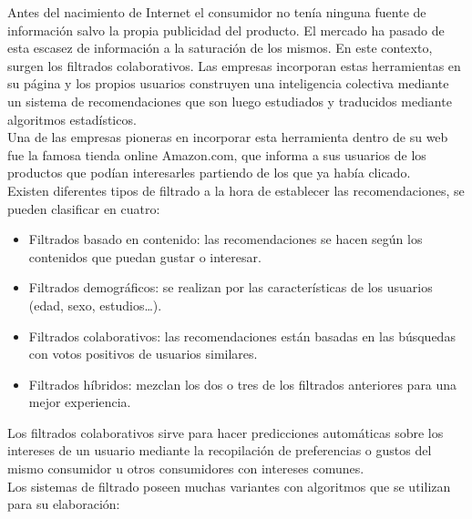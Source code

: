 \documentclass[preprint,12pt]{elsarticle}
\begin{document}
\begin{enumerate}[5.1]
Antes del nacimiento de Internet el consumidor no tenía ninguna fuente de información salvo la propia publicidad del producto. El mercado ha pasado de esta escasez de información a la saturación de los mismos. En este contexto, surgen los filtrados colaborativos. Las empresas incorporan estas herramientas en su página y los propios usuarios construyen una inteligencia colectiva mediante un sistema de recomendaciones que son luego estudiados y traducidos mediante algoritmos estadísticos.\\

Una de las empresas pioneras en incorporar esta herramienta dentro de su web fue la famosa tienda online Amazon.com, que informa a sus usuarios de los productos que podían interesarles partiendo de los que ya había clicado.\\

Existen diferentes tipos de filtrado a la hora de establecer las recomendaciones, se pueden clasificar en cuatro:

   	\begin{itemize}
	\item Filtrados basado en contenido: las recomendaciones se hacen según los contenidos que puedan gustar o interesar.
	\item Filtrados demográficos: se realizan por las características de los usuarios (edad, sexo, estudios…).
	\item Filtrados colaborativos: las recomendaciones están basadas en las búsquedas con votos positivos de usuarios similares.
	\item Filtrados híbridos: mezclan los dos o tres de los filtrados anteriores para una mejor experiencia.
	\end{itemize}

Los filtrados colaborativos sirve para hacer predicciones automáticas sobre los intereses de un usuario mediante la recopilación de preferencias o gustos del mismo consumidor u otros consumidores con intereses comunes.\\

Los sistemas de filtrado poseen muchas variantes con algoritmos que se utilizan para su elaboración: \\


\end{enumerate}
\end{document}
